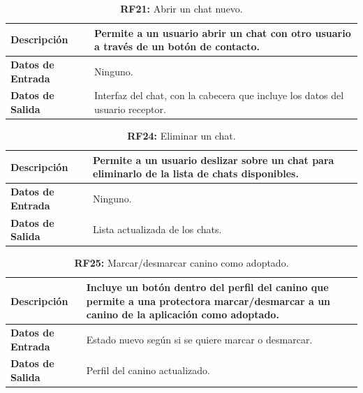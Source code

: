 \documentclass[a4paper, 12pt]{article}
\begin{document}
\begin{table}[H]
\captionsetup{list=no}%
\captionsetup{justification=raggedright,singlelinecheck=false}
\captionsetup{labelformat=empty}
\caption{\textbf{RF21:} Abrir un chat nuevo.}
\label{tab:RF21}
	\begin{tabular}{|m{5cm}|m{10cm}|}
	\hline
	\textbf{Descripción} & Permite a un usuario abrir un chat con otro usuario a través de un botón de contacto. \\ 
	\hline
	\textbf{Datos de Entrada} & Ninguno. \\ 
	\hline
	\textbf{Datos de Salida} & Interfaz del chat, con la cabecera que incluye los datos del usuario receptor. \\ 
	\hline
\end{tabular}
\end{table}

\begin{table}[H]
\captionsetup{list=no}%
\captionsetup{justification=raggedright,singlelinecheck=false}
\captionsetup{labelformat=empty}
\caption{\textbf{RF24:} Eliminar un chat.}
\label{tab:RF24}
	\begin{tabular}{|m{5cm}|m{10cm}|}
	\hline
	\textbf{Descripción} & Permite a un usuario deslizar sobre un chat para eliminarlo de la lista de chats disponibles. \\ 
	\hline
	\textbf{Datos de Entrada} & Ninguno. \\ 
	\hline
	\textbf{Datos de Salida} & Lista actualizada de los chats. \\ 
	\hline
\end{tabular}
\end{table}

\begin{table}[H]
\captionsetup{list=no}%
\captionsetup{justification=raggedright,singlelinecheck=false}
\captionsetup{labelformat=empty}
\caption{\textbf{RF25:} Marcar/desmarcar canino como adoptado.}
\label{tab:RF25}
	\begin{tabular}{|m{5cm}|m{10cm}|}
	\hline
	\textbf{Descripción} & Incluye un botón dentro del perfil del canino que permite a una protectora marcar/desmarcar a un canino de la aplicación como adoptado. \\ 
	\hline
	\textbf{Datos de Entrada} & Estado nuevo según si se quiere marcar o desmarcar. \\ 
	\hline
	\textbf{Datos de Salida} & Perfil del canino actualizado. \\ 
	\hline
\end{tabular}
\end{table}
\end{document}
